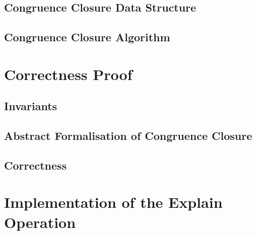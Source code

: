 \subsection{Congruence Closure Data Structure}

\subsection{Congruence Closure Algorithm}

\section{Correctness Proof}

\subsection{Invariants}

\subsection{Abstract Formalisation of Congruence Closure}

\subsection{Correctness}

\section{Implementation of the Explain Operation}
